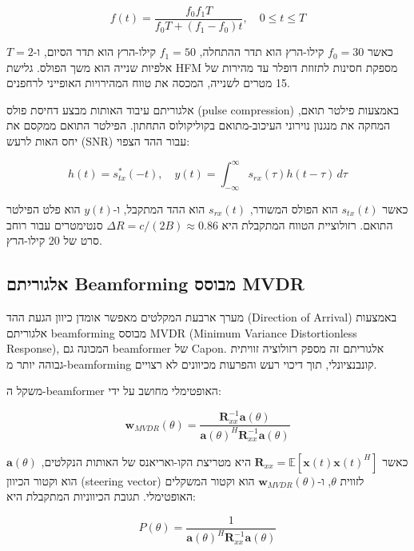 \begin{equation}
f(t) = \frac{f_0 f_1 T}{f_0 T + (f_1 - f_0) t}, \quad 0 \leq t \leq T
\label{eq:ch06_hfm}
\end{equation}

כאשר $f_0 = 30$ קילו-הרץ הוא תדר ההתחלה, $f_1 = 50$ קילו-הרץ הוא תדר הסיום, ו-$T = 2$ אלפיות שנייה הוא משך הפולס. גלישת HFM מספקת חסינות לתזוזת דופלר עד מהירות של 15 מטרים לשנייה, המכסה את טווח המהירויות האופייני לרחפנים.

אלגוריתם עיבוד האותות מבצע דחיסת פולס (pulse compression) באמצעות פילטר תואם, המחקה את מנגנון נוירוני העיכוב-מתואם בקוליקולוס התחתון. הפילטר התואם ממקסם את יחס האות לרעש (SNR) עבור ההד הצפוי:

\begin{equation}
h(t) = s_{tx}^*(-t), \quad y(t) = \int_{-\infty}^{\infty} s_{rx}(\tau) h(t - \tau) \, d\tau
\label{eq:ch06_matched_filter}
\end{equation}

כאשר $s_{tx}(t)$ הוא הפולס המשודר, $s_{rx}(t)$ הוא ההד המתקבל, ו-$y(t)$ הוא פלט הפילטר התואם. רזולוציית הטווח המתקבלת היא $\Delta R = c / (2B) \approx 0.86$ סנטימטרים עבור רוחב סרט של 20 קילו-הרץ.

\subsection{אלגוריתם Beamforming מבוסס MVDR}
\label{sec:ch06_beamforming}

מערך ארבעת המקלטים מאפשר אומדן כיוון הגעת ההד (Direction of Arrival) באמצעות אלגוריתם beamforming מבוסס MVDR (Minimum Variance Distortionless Response), המכונה גם beamformer של Capon. אלגוריתם זה מספק רזולוציה זוויתית גבוהה יותר מ-beamforming קונבנציונלי, תוך דיכוי רעש והפרעות מכיוונים לא רצויים.

משקל ה-beamformer האופטימלי מחושב על ידי:

\begin{equation}
\mathbf{w}_{MVDR}(\theta) = \frac{\mathbf{R}_{xx}^{-1} \mathbf{a}(\theta)}{\mathbf{a}(\theta)^H \mathbf{R}_{xx}^{-1} \mathbf{a}(\theta)}
\label{eq:ch06_mvdr}
\end{equation}

כאשר $\mathbf{R}_{xx} = \mathbb{E}[\mathbf{x}(t) \mathbf{x}(t)^H]$ היא מטריצת הקו-ואריאנס של האותות הנקלטים, $\mathbf{a}(\theta)$ הוא וקטור הכיוון (steering vector) לזווית $\theta$, ו-$\mathbf{w}_{MVDR}(\theta)$ הוא וקטור המשקלים האופטימלי. תגובת הכיווניות המתקבלת היא:

\begin{equation}
P(\theta) = \frac{1}{\mathbf{a}(\theta)^H \mathbf{R}_{xx}^{-1} \mathbf{a}(\theta)}
\label{eq:ch06_mvdr_response}
\end{equation}

